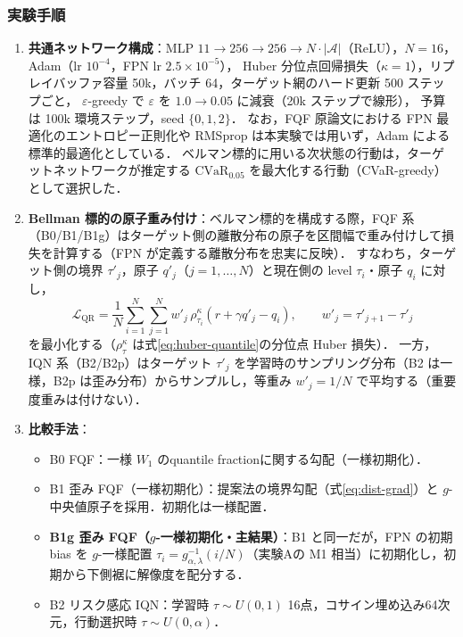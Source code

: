 \documentclass[a4paper,10pt]{jsarticle}
\theoremstyle{definition}
\newcommand{\CVaR}{\mathrm{CVaR}}
\newcommand{\Wone}{W_1}
\begin{document}
\subsubsection{実験手順}
\begin{enumerate}
  \item \textbf{共通ネットワーク構成}：MLP $11\to256\to256\to N\cdot|\mathcal A|$（ReLU），$N=16$，Adam（lr $10^{-4}$，FPN lr $2.5\times10^{-5}$），
  Huber 分位点回帰損失（$\kappa=1$），リプレイバッファ容量 50k，バッチ 64，ターゲット網のハード更新 500 ステップごと，
  $\varepsilon$-greedy で $\varepsilon$ を $1.0\to0.05$ に減衰（20k ステップで線形），
  予算は 100k 環境ステップ，seed $\{0,1,2\}$．
  なお，FQF 原論文における FPN 最適化のエントロピー正則化や RMSprop は本実験では用いず，Adam による標準的最適化としている．
  ベルマン標的に用いる次状態の行動は，ターゲットネットワークが推定する $\CVaR_{0.05}$ を最大化する行動（CVaR-greedy）として選択した．
  \item \textbf{Bellman 標的の原子重み付け}：ベルマン標的を構成する際，FQF 系（B0/B1/B1g）はターゲット側の離散分布の原子を区間幅で重み付けして損失を計算する（FPN が定義する離散分布を忠実に反映）．
  すなわち，ターゲット側の境界 $\tau'_j$，原子 $q'_j$（$j=1,\dots,N$）と現在側の level $\tau_i$・原子 $q_i$ に対し，
  \begin{equation}
    \mathcal{L}_{\mathrm{QR}}=\frac1N\sum_{i=1}^N\sum_{j=1}^N w'_j\,\rho^\kappa_{\tau_i}\!\left(r+\gamma q'_j-q_i\right),\qquad w'_j=\tau'_{j+1}-\tau'_j
    \label{eq:b-loss}
  \end{equation}
  を最小化する（$\rho^\kappa_\tau$ は式\eqref{eq:huber-quantile}の分位点 Huber 損失）．
  一方，IQN 系（B2/B2p）はターゲット $\tau'_j$ を学習時のサンプリング分布（B2 は一様，B2p は歪み分布）からサンプルし，等重み $w'_j=1/N$ で平均する（重要度重みは付けない）．
  \item \textbf{比較手法}：
  \begin{itemize}
    \item B0 FQF：一様 $\Wone$ のquantile fractionに関する勾配（一様初期化）．
    \item B1 歪み FQF（一様初期化）：提案法の境界勾配（式\eqref{eq:dist-grad}）と $g$-中央値原子を採用．初期化は一様配置．
    \item \textbf{B1g 歪み FQF（$g$-一様初期化・主結果）}：B1 と同一だが，FPN の初期 bias を $g$-一様配置 $\tau_i = g^{-1}_{\alpha,\lambda}(i/N)$（実験Aの M1 相当）に初期化し，初期から下側裾に解像度を配分する．
    \item B2 リスク感応 IQN：学習時 $\tau\sim U(0,1)$ 16点，コサイン埋め込み64次元，行動選択時 $\tau\sim U(0,\alpha)$．

\end{itemize}
\end{enumerate}
\end{document}
